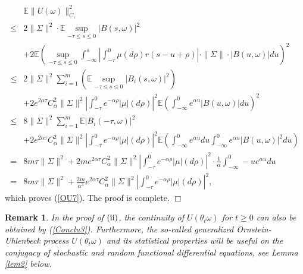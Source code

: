\documentclass[preprint,12pt]{elsarticle}
\newtheorem{remark}{Remark}[section]
\begin{document}
\begin{align}\label{eq20}
&\mathbb{E}\|U(\omega)\|_{C_\tau}^2\nonumber\\
\leq&2\|\Sigma\|^2\cdot\mathbb{E}\sup_{-\tau\leq s\leq0}|B(s,\omega)|^2\nonumber\\
&+2\mathbb{E}\left(\sup_{-\tau\leq s\leq0}\int_{-\infty}^{s}\left|\int_{-\tau}^0\mu(d\rho)r(s-u+\rho)\right|\cdot\|\Sigma\|\cdot|B(u,\omega)|du\right)^2\nonumber\\
\leq&2\|\Sigma\|^2\sum_{i=1}^m\left(\mathbb{E}\sup_{-\tau\leq s\leq0}|B_i(s,\omega)|^2\right)\nonumber\\
&+2e^{2\alpha\tau}C_\alpha^2\|\Sigma\|^2\left|\int_{-\tau}^0e^{-\alpha\rho}|\mu|(d\rho)\right|^2\mathbb{E}\left(\int_{-\infty}^0e^{\alpha u}|B(u,\omega)|du\right)^2\nonumber\\
\leq&8\|\Sigma\|^2\sum_{i=1}^m\mathbb{E}|B_i(-\tau,\omega)|^2\nonumber\\
&+2e^{2\alpha\tau}C_\alpha^2\|\Sigma\|^2\left|\int_{-\tau}^0e^{-\alpha\rho}|\mu|(d\rho)\right|^2\mathbb{E}\left(\int_{-\infty}^0e^{\alpha u}du\int_{-\infty}^0e^{\alpha u}|B(u,\omega)|^2du\right)\nonumber\\
=&8m\tau\|\Sigma\|^2+2me^{2\alpha\tau}C_\alpha^2\|\Sigma\|^2\left|\int_{-\tau}^0e^{-\alpha\rho}|\mu|(d\rho)\right|^2\cdot\frac1\alpha\int_{-\infty}^0-ue^{\alpha u}du\nonumber\\
=&8m\tau\|\Sigma\|^2+\frac{2m}{\alpha^3}e^{2\alpha\tau}C_\alpha^2\|\Sigma\|^2\left|\int_{-\tau}^0e^{-\alpha\rho}|\mu|(d\rho)\right|^2,
\end{align}
which proves (\ref{OU7}). The proof is complete.
\quad\quad$\Box$

\begin{remark}
{\rm In the proof of $\rm (ii)$, the continuity of $U(\theta_t\omega)$ for $t\geq0$ can also be obtained by  (\ref{Conclu3}). Furthermore, the so-called generalized Ornstein-Uhlenbeck process $U(\theta_t\omega)$ and its statistical properties will be useful on the conjugacy of stochastic and random functional differential equations, see Lemma \ref{lem2} below.}
\end{remark}
\end{document}
